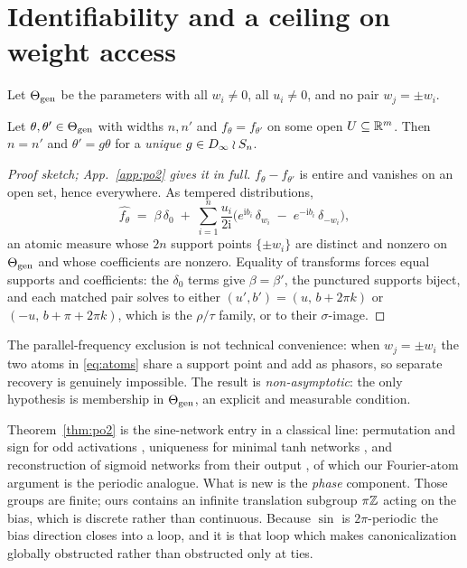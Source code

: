\section{Identifiability and a ceiling on weight access}\label{sec:ident}

Let $\Theta_{\mathrm{gen}}$ be the parameters with all $w_i \neq 0$, all $u_i \neq 0$, and no pair
$w_j = \pm w_i$.

\begin{theorem}[Generic identifiability, $L=1$]\label{thm:po2}
Let $\theta,\theta' \in \Theta_{\mathrm{gen}}$ with widths $n, n'$ and $f_\theta = f_{\theta'}$ on some open
$U \subseteq \mathbb{R}^m$. Then $n = n'$ and $\theta' = g\theta$ for a \emph{unique} $g \in D_\infty \wr S_n$.
\end{theorem}

\begin{proof}[Proof sketch; App.~\ref{app:po2} gives it in full]
$f_\theta - f_{\theta'}$ is entire and vanishes on an open set, hence everywhere. As tempered
distributions,
\begin{equation}
\widehat{f_\theta} \;=\; \beta\,\delta_0 \;+\; \sum_{i=1}^{n} \frac{u_i}{2\mathrm i}
\Big( e^{\mathrm i b_i}\,\delta_{w_i} \;-\; e^{-\mathrm i b_i}\,\delta_{-w_i} \Big),
\label{eq:atoms}
\end{equation}
an atomic measure whose $2n$ support points $\{\pm w_i\}$ are distinct and nonzero on $\Theta_{\mathrm{gen}}$ and
whose coefficients are nonzero. Equality of transforms forces equal supports and coefficients: the
$\delta_0$ terms give $\beta=\beta'$, the punctured supports biject, and each matched pair solves to
either $(u',b') = (u,\, b+2\pi k)$ or $(-u,\, b+\pi+2\pi k)$, which is the $\rho/\tau$ family, or to
their $\sigma$-image.
\end{proof}

The parallel-frequency exclusion is not technical convenience: when $w_j = \pm w_i$ the two atoms in
\eqref{eq:atoms} share a support point and add as phasors, so separate recovery is genuinely
impossible. The result is \emph{non-asymptotic}: the only hypothesis is membership in $\Theta_{\mathrm{gen}}$, an
explicit and measurable condition.

Theorem~\ref{thm:po2} is the sine-network entry in a classical line: permutation and sign for odd
activations \citep{hechtnielsen1990algebraic}, uniqueness for minimal tanh networks
\citep{sussmann1992uniqueness}, and reconstruction of sigmoid networks from their output
\citep{fefferman1994reconstructing}, of which our Fourier-atom argument is the periodic analogue.
What is new is the \emph{phase} component. Those groups are finite; ours contains an infinite
translation subgroup $\pi\mathbb{Z}$ acting on the bias, which is discrete rather than continuous. Because
$\sin$ is $2\pi$-periodic the bias direction closes into a loop, and it is that loop which makes
canonicalization globally obstructed rather than obstructed only at ties.


